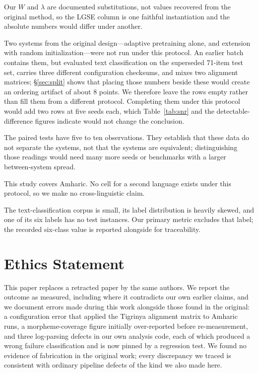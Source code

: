 \documentclass[11pt]{article}
\begin{document}
Our $W$ and $\lambda$ are documented substitutions, not values recovered
from the original method, so the LGSE column is one faithful instantiation
and the absolute numbers would differ under another.

Two systems from the original design---adaptive pretraining alone, and
extension with random initialization---were not run under this protocol. An
earlier batch contains them, but evaluated text classification on the
superseded 71-item test set, carries three different configuration
checksums, and mixes two alignment matrices; \S\ref{sec:split} shows that
placing those numbers beside these would create an ordering artifact of
about 8 points. We therefore leave the rows empty rather than fill them from
a different protocol. Completing them under this protocol would add two rows
at five seeds each, which Table~\ref{tab:snr} and the detectable-difference
figures indicate would not change the conclusion.

The paired tests have five to ten observations. They establish that these
data do not separate the systems, not that the systems are equivalent;
distinguishing those readings would need many more seeds or benchmarks with
a larger between-system spread.

This study covers Amharic. No cell for a second language exists under this
protocol, so we make no cross-linguistic claim.

The text-classification corpus is small, its label distribution is heavily
skewed, and one of its six labels has no test instances. Our primary metric
excludes that label; the recorded six-class value is reported alongside for
traceability.

\section*{Ethics Statement}

This paper replaces a retracted paper by the same authors. We report the
outcome as measured, including where it contradicts our own earlier claims,
and we document errors made during this work alongside those found in the
original: a configuration error that applied the Tigrinya alignment matrix
to Amharic runs, a morpheme-coverage figure initially over-reported before
re-measurement, and three log-parsing defects in our own analysis code, each
of which produced a wrong failure classification and is now pinned by a
regression test. We found no evidence of fabrication in the original work;
every discrepancy we traced is consistent with ordinary pipeline defects of
the kind we also made here.
\end{document}

